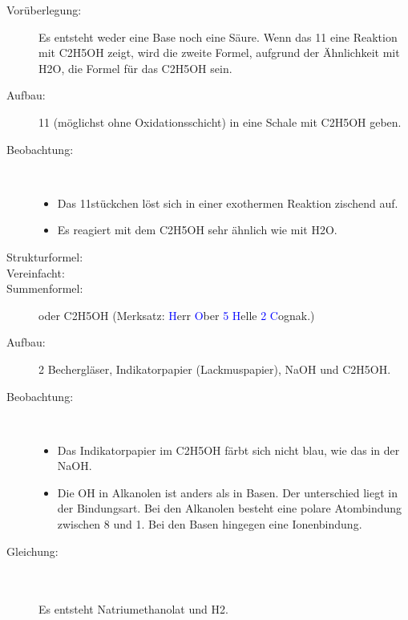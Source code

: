 \begin{description}
	\item[Vorüberlegung:] Es entsteht weder eine Base noch eine Säure.
		Wenn das \ac{11} eine Reaktion mit \ac{C2H5OH} zeigt,
		wird die zweite Formel, aufgrund der Ähnlichkeit mit \ac{H2O},
		die Formel für das \ac{C2H5OH} sein.
	\item[Aufbau:] \ac{11} (möglichst ohne Oxidationsschicht) in eine Schale mit
		\ac{C2H5OH} geben. \\
	\item[Beobachtung:]~
	\begin{itemize}
		\item Das \acl{11}stückchen löst sich in einer exothermen Reaktion zischend auf.
		\item Es reagiert mit dem \ac{C2H5OH} sehr ähnlich wie mit \ac{H2O}.
	\end{itemize}
	\item[Strukturformel:] 
	\item[Vereinfacht:] 
	\item[Summenformel:]  oder \acs{C2H5OH}
		\hfil (Merksatz: \textcolor{blue}{H}err \textcolor{blue}{O}ber \textcolor{blue}{5 H}elle
		\textcolor{blue}{2 C}ognak.)
\end{description}

\begin{description}
	\item[Aufbau:] 2 Bechergläser,
		Indikatorpapier (Lackmuspapier),
		\ac{NaOH} und \ac{C2H5OH}.
	\item[Beobachtung:]~
	\begin{itemize}
		\item Das Indikatorpapier im \ac{C2H5OH} färbt sich nicht blau,
			wie das in der \ac{NaOH}.
		\item Die OH in Alkanolen ist anders als in Basen.
			Der unterschied liegt in der Bindungsart.
			Bei den Alkanolen besteht eine polare Atombindung zwischen \ac{8} und \ac{1}.
			Bei den Basen hingegen eine Ionenbindung.
	\end{itemize}
	\item[Gleichung:]
		 \chemsign{+} 
		\chemsign{\ce{->}}
		 \chemsign{+}  \\[0.8ex]
		 \\
		Es entsteht Natriumethanolat und \acl{H2}.
\end{description}

